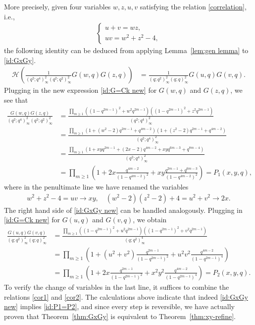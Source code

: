 \documentclass[11pt,reqno]{amsart}
\numberwithin{equation}{section}
\theoremstyle{plain}
\theoremstyle{definition}
\theoremstyle{named}
\def\cH{\mathcal{H}}
\begin{document}
More precisely, given four variables $w,z,u,v$ satisfying the relation \eqref{correlation}, i.e.,
\begin{align}
\label{cor1}
\begin{cases}
u+v=wz,\\
uv=w^2+z^2-4,
\end{cases}
\end{align}
the following identity can be deduced from applying Lemma~\ref{lem:gen lemma} to \eqref{id:GxGy}.
\begin{align}\label{id:GxGy new}
\cH\left(\frac{1}{(q^2;q^4)^2_{\infty}(q^2;q^2)^2_{\infty}}G(w,q)G(z,q)\right) &= \frac{1}{(q;q^2)^2_{\infty}(q;q)^2_{\infty}}G(u,q)G(v,q).
\end{align}
Plugging in the new expression \eqref{id:G=Ck new} for $G(w,q)$ and $G(z,q)$, we see that
\begin{align*}
\frac{G(w,q)G(z,q)}{(q^2;q^4)^2_{\infty}(q^2;q^2)^2_{\infty}} &= \frac{\prod_{m\ge 1}((1-q^{2m-1})^2+w^2q^{2m-1})((1-q^{2m-1})^2+z^2q^{2m-1})}{(q^2;q^4)^2_{\infty}}\\
&= \frac{\prod_{m\ge 1}\left(1+(w^2-2)q^{2m-1}+q^{4m-2}\right)\left(1+(z^2-2)q^{2m-1}+q^{4m-2}\right)}{(q^2;q^4)^2_{\infty}}\\
&= \frac{\prod_{m\ge 1}\left(1+xyq^{2m-1}+(2x-2)q^{4m-2}+xyq^{6m-3}+q^{8m-4}\right)}{(q^2;q^4)^2_{\infty}}\\
&=\prod_{m\ge 1}\left(1+2x\frac{q^{4m-2}}{(1-q^{4m-2})^2}+xy\frac{q^{2m-1}+q^{6m-3}}{(1-q^{4m-2})^2}\right)= P_1(x,y,q),
\end{align*}
where in the penultimate line we have renamed the variables
\begin{align}\label{cor2}
w^2+z^2-4=uv\to xy, \quad (w^2-2)(z^2-2)+4=u^2+v^2\to 2x.
\end{align}
The right hand side of \eqref{id:GxGy new} can be handled analogously. Plugging in \eqref{id:G=Ck new} for $G(u,q)$ and $G(v,q)$, we obtain 
\begin{align*}
\frac{G(u,q)G(v,q)}{(q;q^2)^2_{\infty}(q;q)^2_{\infty}} &= \frac{\prod_{m\ge 1}((1-q^{2m-1})^2+u^2q^{2m-1})((1-q^{2m-1})^2+v^2q^{2m-1})}{(q;q^2)^4_{\infty}}\\
&= \prod_{m\ge 1}\left(1+(u^2+v^2)\frac{q^{2m-1}}{(1-q^{2m-1})^2}+u^2v^2\frac{q^{4m-2}}{(1-q^{2m-1})^4}\right)\\
&= \prod_{m\ge 1}\left(1+2x\frac{q^{2m-1}}{(1-q^{2m-1})^2}+x^2y^2\frac{q^{4m-2}}{(1-q^{2m-1})^4}\right)=P_2(x,y,q).
\end{align*}
To verify the change of variables in the last line, it suffices to combine the relations \eqref{cor1} and \eqref{cor2}. The calculations above indicate that indeed \eqref{id:GxGy new} implies \eqref{id:P1=P2}, and since every step is reversible, we have actually proven that Theorem~\ref{thm:GxGy} is equivalent to Theorem~\ref{thm:xy-refine}. 
\end{document}
